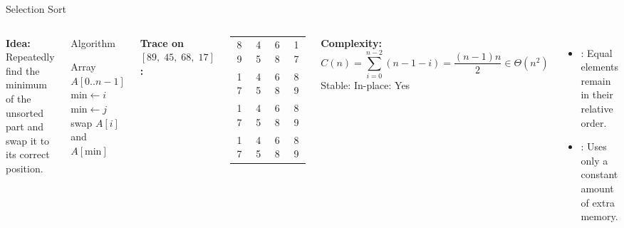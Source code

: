 \documentclass[aspectratio=169]{beamer}
\begin{document}
\begin{frame}[shrink=12]{Selection Sort}
  \begin{columns}[T]
      \textbf{Idea:} Repeatedly find the minimum of the unsorted part and
      swap it to its correct position.
      \vspace{0.3em}
      \begin{block}{Algorithm}
        \begin{algorithmic}[1]
          \Require Array $A[0..n{-}1]$
            \State $\text{min} \gets i$
                \State $\text{min} \gets j$
              \EndIf
            \EndFor
            \State swap $A[i]$ and $A[\text{min}]$
          \EndFor
        \end{algorithmic}
      \end{block}
      \textbf{Trace on $[89,\;45,\;68,\;17]$:}
      \vspace{0.2em}

      \begin{tabular}{cccc}
        \rowcolor{PrimaryDark}\color{white}89&\color{white}45&
        \color{white}68&\color{white}17 \\
        \rowcolor{PrimaryLight!40}
        \cellcolor{AccentOrange!40}17 & 45 & 68 & 89 \\
        \cellcolor{AccentOrange!40}17 &
        \cellcolor{AccentOrange!40}45 & 68 & 89 \\
        \rowcolor{PrimaryLight!40}
        17 & 45 &
        \cellcolor{AccentOrange!40}68 & 89 \\
      \end{tabular}
      \vspace{0.4em}

      \textbf{Complexity:}
      \[
        C(n)=\sum_{i=0}^{n-2}(n-1-i)=\frac{(n-1)n}{2}\in\Theta(n^2)
      \]
      Stable:  \quad In-place: \textcolor{SuccessGreen}{Yes}
      \begin{itemize}
        \item {}: Equal elements remain in their relative order.
        \item {}: Uses only a constant amount of extra memory.
      \end{itemize}
  \end{columns}
\end{frame}
\end{document}
